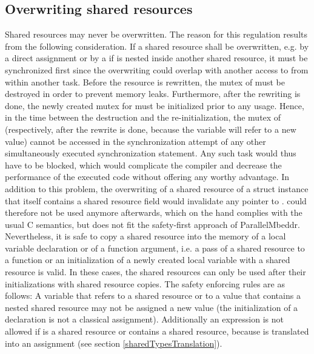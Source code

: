 \subsection{Overwriting shared resources}
\label{overwritingSharedResources}
Shared resources may never be overwritten. The reason for this regulation results from the following consideration. If a shared resource  shall be overwritten, e.g. by a direct assignment or by a  if  is nested inside another shared resource, it must be synchronized first since the overwriting could overlap with another access to  from within another task. Before the resource is rewritten, the mutex of  must be destroyed in order to prevent memory leaks. Furthermore, after the rewriting is done, the newly created mutex for  must be initialized prior to any usage. Hence, in the time between the destruction and the re-initialization, the mutex of  (respectively,  after the rewrite is done, because the variable will refer to a new value) cannot be accessed in the synchronization attempt of any other simultaneously executed synchronization statement. Any such task would thus have to be blocked, which would complicate the compiler and decrease the performance of the executed code without offering any worthy advantage. In addition to this problem, the overwriting of a shared resource of a struct instance that itself contains a shared resource field  would invalidate any pointer  to .  could therefore not be used anymore afterwards, which on the hand complies with the usual C semantics, but does not fit the safety-first approach of ParallelMbeddr.
Nevertheless, it is safe to copy a shared resource into the memory of a local variable declaration or of a function argument, i.e. a pass of a shared resource to a function or an initialization of a newly created local variable with a shared resource is valid. In these cases, the shared resources can only be used after their initializations with shared resource copies.
The safety enforcing rules are as follows: A variable that refers to a shared resource or to a value that contains a nested shared resource may not be assigned a new value (the initialization of a declaration is not a classical assignment). Additionally an expression  is not allowed if  is a shared resource or contains a shared resource, because  is translated into an assignment (see section \ref{sharedTypesTranslation}).

